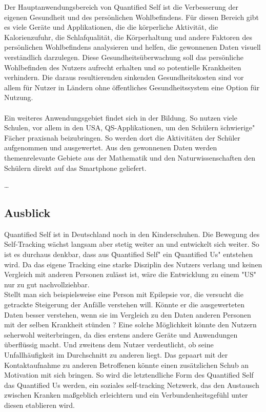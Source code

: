 Der Hauptanwendungsbereich von Quantified Self ist die Verbesserung der eigenen Gesundheit und des persönlichen Wohlbefindens. 
Für diesen Bereich gibt es viele Geräte und Applikationen, die die körperliche Aktivität, die Kalorienzufuhr, die Schlafqualität, die Körperhaltung und andere Faktoren des persönlichen Wohlbefindens analysieren und helfen, die gewonnenen Daten visuell verständlich darzulegen. 
Diese Gesundheitsüberwachung soll das persönliche Wohlbefinden des Nutzers aufrecht erhalten und so potentielle Krankheiten verhindern.
Die daraus resultierenden sinkenden Gesundheitskosten sind vor allem für Nutzer in Ländern ohne öffentliches Gesundheitssystem eine Option für Nutzung.
\\
\\
Ein weiteres Anwendungsgebiet findet sich in der Bildung. 
So nutzen viele Schulen, vor allem in den USA, QS-Applikationen, um den Schülern \"schwierige" Fächer praxisnah beizubringen. 
So werden dort die Aktivitäten der Schüler aufgenommen und ausgewertet.
Aus den gewonnenen Daten werden themenrelevante Gebiete aus der Mathematik und den Naturwissenschaften den Schülern direkt auf das Smartphone geliefert. 

\ldots 


\subsection{Ausblick}
\label{ch:Grundlagen:sec:Quantified Self:subsec:Ausblick}

Quantified Self ist in Deutschland noch in den Kinderschuhen.
Die Bewegung des Self-Tracking wächst langsam aber stetig weiter an und entwickelt sich weiter.
So ist es durchaus denkbar, dass aus \"Quantified Self"  ein \"Quantified Us" entstehen wird.
Da das eigene Tracking eine starke Disziplin des Nutzers verlang und keinen Vergleich mit anderen Personen zulässt ist, wäre die Entwicklung zu einem "US" nur zu gut nachvollziehbar.
\\
Stellt man sich beispielsweise eine Person mit Epilepsie vor, die versucht die getrackte Steigerung der Anfälle verstehen will. 
Könnte er die ausgewerteten Daten besser verstehen, wenn sie im Vergleich zu den Daten anderen Personen mit der selben Krankheit stünden ? 
Eine solche Möglichkeit könnte den Nutzern seherwohl weiterbringen, da dies erstens andere Geräte und Anwendungen überflüssig macht. 
Und zweitens dem Nutzer verdeutlicht, ob seine Unfallhäufigkeit im Durchschnitt zu anderen liegt.
Das gepaart mit der Kontaktaufnahme zu anderen Betroffenen könnte einen zusätzlichen Schub an Motivation mit sich bringen. 
So wird die letztendliche Form des Quantified Self das Quantified Us werden, ein soziales self-tracking Netzwerk, das den Austausch zwischen Kranken maßgeblich erleichtern  und ein Verbundenheitsgefühl unter diesen etablieren wird.


